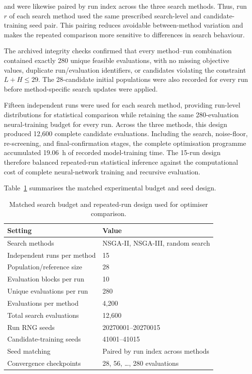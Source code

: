 \documentclass[a4paper,fleqn]{cas-sc}
\begin{document}
and were likewise paired by run index across the three search methods. Thus, run $r$ of each search method used the same prescribed search-level and candidate-training seed pair. This pairing reduces avoidable between-method variation and makes the repeated comparison more sensitive to differences in search behaviour.

The archived integrity checks confirmed that every method--run combination contained exactly 280 unique feasible evaluations, with no missing objective values, duplicate run/evaluation identifiers, or candidates violating the constraint $L+H\leq29$. The 28-candidate initial populations were also recorded for every run before method-specific search updates were applied.

Fifteen independent runs were used for each search method, providing
run-level distributions for statistical comparison while retaining the same
280-evaluation neural-training budget for every run. Across the three methods,
this design produced 12,600 complete candidate evaluations. Including the
search, noise-floor, re-screening, and final-confirmation stages, the complete
optimisation programme accumulated 19.06~h of recorded model-training time.
The 15-run design therefore balanced repeated-run statistical inference
against the computational cost of complete neural-network training and
recursive evaluation.

Table~\ref{tab:search_budget} summarises the matched experimental budget and seed design.

\begin{table}[htbp]
\centering
\caption{Matched search budget and repeated-run design used for optimiser comparison.}
\label{tab:search_budget}
\begin{tabular}{ll}
\toprule
\textbf{Setting} & \textbf{Value} \\
\midrule
Search methods &
NSGA-II, NSGA-III, random search \\

Independent runs per method &
15 \\

Population/reference size &
28 \\

Evaluation blocks per run &
10 \\

Unique evaluations per run &
280 \\

Evaluations per method &
4,200 \\

Total search evaluations &
12,600 \\

Run RNG seeds &
20270001--20270015 \\

Candidate-training seeds &
41001--41015 \\

Seed matching &
Paired by run index across methods \\

Convergence checkpoints &
28, 56, \ldots, 280 evaluations \\
\bottomrule
\end{tabular}
\end{table}
\end{document}
